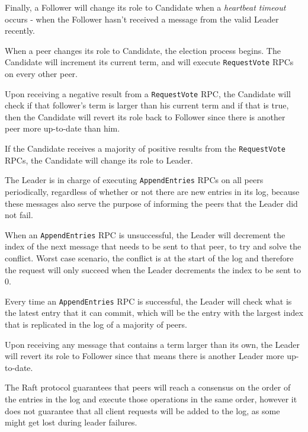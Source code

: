 Finally, a Follower will change its role to Candidate when a \textit{heartbeat timeout} occurs - when the Follower hasn’t received a message from the valid Leader recently.

\vspace{0.5cm}

When a peer changes its role to Candidate, the election process begins. The Candidate will increment its current term, and will execute \texttt{RequestVote} RPCs on every other peer.

Upon receiving a negative result from a \texttt{RequestVote} RPC, the Candidate will check if that follower’s term is larger than his current term and if that is true, then the Candidate will revert its role back to Follower since there is another peer more up-to-date than him.

If the Candidate receives a majority of positive results from the \texttt{RequestVote} RPCs, the Candidate will change its role to Leader.

\vspace{0.5cm}

The Leader is in charge of executing \texttt{AppendEntries} RPCs on all peers periodically, regardless of whether or not there are new entries in its log, because these messages also serve the purpose of informing the peers that the Leader did not fail.

When an \texttt{AppendEntries} RPC is unsuccessful, the Leader will decrement the index of the next message that needs to be sent to that peer, to try and solve the conflict. Worst case scenario, the conflict is at the start of the log and therefore the request will only succeed when the Leader decrements the index to be sent to 0.

Every time an \texttt{AppendEntries} RPC is successful, the Leader will check what is the latest entry that it can commit, which will be the entry with the largest index that is replicated in the log of a majority of peers.

Upon receiving any message that contains a term larger than its own, the Leader will revert its role to Follower since that means there is another Leader more up-to-date.

\vspace{0.5cm}

The Raft protocol guarantees that peers will reach a consensus on the order of the entries in the log and execute those operations in the same order, however it does not guarantee that all client requests will be added to the log, as some might get lost during leader failures.



